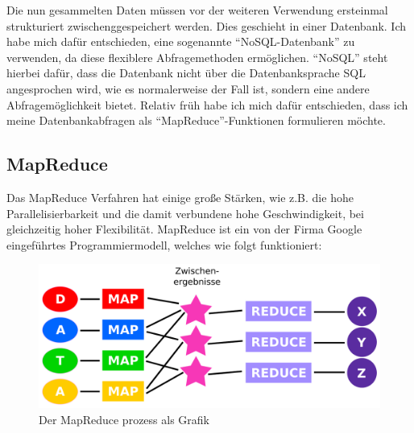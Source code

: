 \documentclass[12pt,ngerman,a4paperpaper,]{paper}
\begin{document}
Die nun gesammelten Daten müssen vor der weiteren Verwendung ersteinmal
strukturiert zwischenggespeichert werden. Dies geschieht in einer
Datenbank. Ich habe mich dafür entschieden, eine sogenannte
``NoSQL-Datenbank'' zu verwenden, da diese flexiblere Abfragemethoden
ermöglichen. ``NoSQL'' steht hierbei dafür, dass die Datenbank nicht
über die Datenbanksprache SQL angesprochen wird, wie es normalerweise
der Fall ist, sondern eine andere Abfragemöglichkeit bietet. Relativ
früh habe ich mich dafür entschieden, dass ich meine Datenbankabfragen
als ``MapReduce''-Funktionen formulieren möchte.

\subsection{MapReduce}\label{mapreduce}

Das MapReduce Verfahren hat einige große Stärken, wie z.B. die hohe
Parallelisierbarkeit und die damit verbundene hohe Geschwindigkeit, bei
gleichzeitig hoher Flexibilität. MapReduce ist ein von der Firma Google
eingeführtes Programmiermodell, welches wie folgt funktioniert:

\begin{no-prefix-figure-caption}

\begin{figure}
\centering
\includegraphics{img/MapReduce.png}
\caption{Der MapReduce prozess als Grafik}
\end{figure}

\end{no-prefix-figure-caption}
\end{document}
